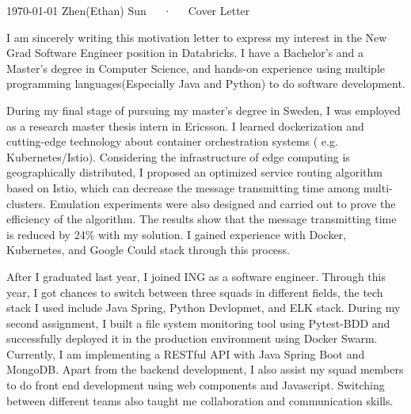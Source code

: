 \documentclass[11pt, a4paper]{awesome-cv}
\begin{document}
\makecvheader[R]

\makecvfooter
  {\today}
  {Zhen(Ethan) Sun~~~·~~~Cover Letter}
  {}

\makelettertitle

\begin{cvletter}

I am sincerely writing this motivation letter to express my interest in the New Grad Software Engineer position in Databricks. I have a Bachelor's and a Master's degree in Computer Science, and hands-on experience using multiple programming languages(Especially Java and Python) to do software development. 

During my final stage of pursuing my master's degree in Sweden, I was employed as a research master thesis intern in Ericsson. I  learned dockerization and cutting-edge technology about container orchestration systems ( e.g. Kubernetes/Istio). Considering the infrastructure of edge computing is geographically distributed, I proposed an optimized service routing algorithm based on Istio, which can decrease the message transmitting time among multi-clusters. Emulation experiments were also designed and carried out to prove the efficiency of the algorithm. The results show that the message transmitting time is reduced by 24\% with my solution. I gained experience with Docker, Kubernetes, and Google Could stack through this process.

After I graduated last year,  I joined ING as a software engineer. Through this year,  I got chances to switch between three squads in different fields, the tech stack I used include Java Spring, Python Devlopmet, and ELK stack. During my second assignment, I built a file system monitoring tool using Pytest-BDD and successfully deployed it in the production environment using Docker Swarm. Currently, I am implementing a RESTful API with Java Spring Boot and MongoDB. Apart from the backend development, I also assist my squad members to do front end development using web components and Javascript. Switching between different teams also taught me collaboration and communication skills.


\end{cvletter}
\end{document}
